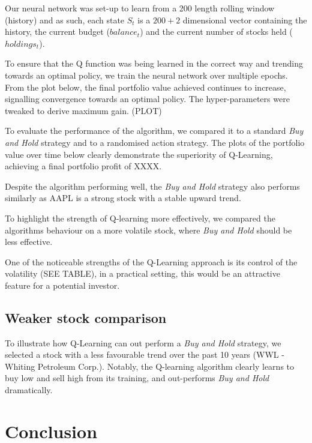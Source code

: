 \documentclass[12pt]{article}
\begin{document}
Our neural network was set-up to learn from a 200 length rolling window (history) and as such, each state $S_{t}$ is a $200+2$ dimensional vector containing the history, the current budget ($balance_{t}$) and the current number of stocks held ($holdings_{t}$).

To ensure that the Q function was being learned in the correct way and trending towards an optimal policy, we train the neural network over multiple epochs. From the plot below, the final portfolio value achieved continues to increase, signalling convergence towards an optimal policy. The hyper-parameters were tweaked to derive maximum gain. (PLOT)

To evaluate the performance of the algorithm, we compared it to a standard \textit{Buy and Hold} strategy and to a randomised action strategy. The plots of the portfolio value over time below clearly demonstrate the superiority of Q-Learning, achieving a final portfolio profit of XXXX.

Despite the algorithm performing well, the \textit{Buy and Hold} strategy also performs similarly as AAPL is a strong stock with a stable upward trend.



To highlight the strength of Q-learning more effectively, we compared the algorithms behaviour on a more volatile stock, where \textit{Buy and Hold} should be less effective.

One of the noticeable strengths of the Q-Learning approach is its control of the volatility (SEE TABLE), in a practical setting, this would be an attractive feature for a potential investor.

\subsection{Weaker stock comparison}

To illustrate how Q-Learning can out perform a \textit{Buy and Hold} strategy, we selected a stock with a less favourable trend over the past 10 years (WWL - Whiting Petroleum Corp.). Notably, the Q-learning algorithm clearly learns to buy low and sell high from its training, and out-performs \textit{Buy and Hold} dramatically.


\section{Conclusion}
\end{document}
